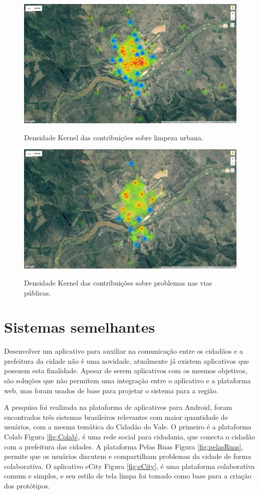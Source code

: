     \begin{figure}[H]
    	\centering
    	\caption{Densidade Kernel das contribuições sobre limpeza urbana.}
    	\includegraphics[width=0.6\linewidth]{Imagens/03}
    	\label{fig:cidLimpeza}
    \end{figure}
    
    \begin{figure}[H]
    	\centering
    	\caption{Densidade Kernel das contribuições sobre problemas nas vias públicas.}	
    	\includegraphics[width=0.6\linewidth]{Imagens/04}
    	\label{fig:cidVias}
    \end{figure}

\section{Sistemas semelhantes}
    Desenvolver um aplicativo para auxiliar na comunicação entre os cidadãos e a prefeitura da cidade não é uma novidade, atualmente já existem aplicativos que possuem esta finalidade. Apesar de serem aplicativos com os mesmos objetivos, são soluções que não permitem uma integração entre o aplicativo e a plataforma web, mas foram usados de base para projetar o sistema para a região.

    A pesquisa foi realizada na plataforma de aplicativos para Android, foram encontrados três sistemas brasileiros relevantes com maior quantidade de usuários, com a mesma temática do Cidadão do Vale. O primeiro é a plataforma Colab Figura \ref{fig:Colab}, é uma rede social para cidadania, que conecta o cidadão com a prefeitura das cidades. A plataforma Pelas Ruas Figura \ref{fig:pelasRuas}, permite que os usuários discutem e compartilham problemas da cidade de forma colaborativa. O aplicativo eCity Figura \ref{fig:eCity}, é uma plataforma colaborativa comum e simples, e seu estilo de tela limpa foi tomado como base para a criação dos protótipos.

